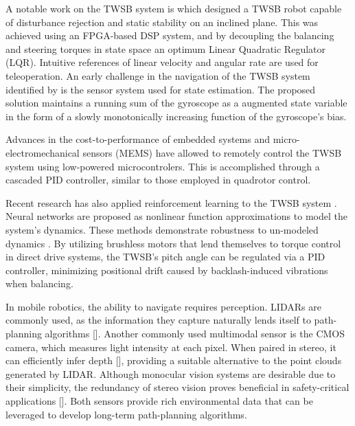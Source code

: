     A notable work on the TWSB system is \cite{grasser2002joe} which designed a TWSB robot capable of disturbance
    rejection and static stability on an inclined plane. This was achieved using an FPGA-based DSP system, 
    and by decoupling the balancing and steering torques in state space an optimum Linear Quadratic Regulator (LQR). 
    Intuitive references of linear velocity and angular rate are used for teleoperation. An early challenge in the navigation of the TWSB system 
    identified by \cite{SelfContainedMobileTWSB} is the sensor system used for state estimation. The proposed solution 
    maintains a running sum of the gyroscope as a augmented state variable in the form of a slowly monotonically increasing function of the gyroscope's bias.

    Advances in the cost-to-performance of embedded systems and micro-electromechanical sensors (MEMS) \cite{MEMS} 
    have allowed \cite{juang2013design} \cite{Velazquez2016VelocityAM} to remotely control the TWSB system 
    using low-powered microcontrolers. This is accomplished through a cascaded PID controller, 
    similar to those employed in quadrotor control.
    
    Recent research has also applied reinforcement learning to the TWSB system \cite{kober2013reinforcement}.
    Neural networks are proposed as nonlinear function approximations to model the system's dynamics. 
    These methods demonstrate robustness to un-modeled dynamics \cite{guo2021optimal}. By utilizing 
    brushless motors that lend themselves to torque control in direct drive systems, the TWSB’s pitch 
    angle can be regulated via a PID controller, minimizing positional drift caused by backlash-induced 
    vibrations when balancing.
    
    In mobile robotics, the ability to navigate requires perception. LIDARs are commonly used, as  
    the information they capture naturally lends itself to path-planning algorithms [].
    Another commonly used multimodal sensor is the CMOS camera, which measures light intensity at each pixel. 
    When paired in stereo, it can efficiently infer depth [], providing a suitable alternative to the point 
    clouds generated by LIDAR. Although monocular vision systems are desirable due to their simplicity, 
    the redundancy of stereo vision proves beneficial in safety-critical applications [].
    Both sensors provide rich environmental data that can be leveraged to develop long-term path-planning algorithms.
    
